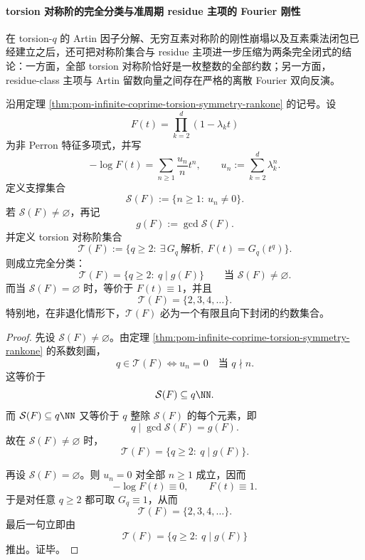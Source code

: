 \paragraph{torsion 对称阶的完全分类与准周期 residue 主项的 Fourier 刚性}
在 torsion-\(q\) 的 Artin 因子分解、无穷互素对称阶的刚性崩塌以及互素乘法闭包已经建立之后，还可把对称阶集合与 residue 主项进一步压缩为两条完全闭式的结论：一方面，全部 torsion 对称阶恰好是一枚整数的全部约数；另一方面，residue-class 主项与 Artin 留数向量之间存在严格的离散 Fourier 双向反演。

\begin{theorem}\label{thm:pom-torsion-symmetry-order-complete-classification}
沿用定理 \ref{thm:pom-infinite-coprime-torsion-symmetry-rankone} 的记号。设
\[
F(t)=\prod_{k=2}^{d}(1-\lambda_k t)
\]
为非 Perron 特征多项式，并写
\[
-\log F(t)=\sum_{n\ge 1}\frac{u_n}{n}t^n,
\qquad
u_n:=\sum_{k=2}^{d}\lambda_k^n.
\]
定义支撑集合
\[
\mathcal S(F):=\{n\ge 1:\ u_n\neq 0\}.
\]
若 \(\mathcal S(F)\neq\varnothing\)，再记
\[
g(F):=\gcd \mathcal S(F).
\]
并定义 torsion 对称阶集合
\[
\mathcal T(F):=\{q\ge 2:\ \exists\, G_q\ \text{解析},\ F(t)=G_q(t^q)\}.
\]
则成立完全分类：
\[
\boxed{\;
\mathcal T(F)
=
\{q\ge 2:\ q\mid g(F)\}
\qquad\text{当 }\mathcal S(F)\neq\varnothing.\;}
\]
而当 \(\mathcal S(F)=\varnothing\) 时，等价于 \(F(t)\equiv 1\)，并且
\[
\boxed{\;
\mathcal T(F)=\{2,3,4,\dots\}.\;}
\]
特别地，在非退化情形下，\(\mathcal T(F)\) 必为一个有限且向下封闭的约数集合。
\end{theorem}
\begin{proof}
先设 \(\mathcal S(F)\neq\varnothing\)。由定理 \ref{thm:pom-infinite-coprime-torsion-symmetry-rankone} 的系数刻画，
\[
q\in\mathcal T(F)
\iff
u_n=0\quad\text{当 }q\nmid n.
\]
这等价于
\[
\mathcal S(F)\subseteq q\NN.
\]
而 \(\mathcal S(F)\subseteq q\NN\) 又等价于 \(q\) 整除 \(\mathcal S(F)\) 的每个元素，即
\[
q\mid \gcd \mathcal S(F)=g(F).
\]
故在 \(\mathcal S(F)\neq\varnothing\) 时，
\[
\mathcal T(F)=\{q\ge 2:\ q\mid g(F)\}.
\]

再设 \(\mathcal S(F)=\varnothing\)。则 \(u_n=0\) 对全部 \(n\ge 1\) 成立，因而
\[
-\log F(t)\equiv 0,
\qquad
F(t)\equiv 1.
\]
于是对任意 \(q\ge 2\) 都可取 \(G_q\equiv 1\)，从而
\[
\mathcal T(F)=\{2,3,4,\dots\}.
\]
最后一句立即由
\[
\mathcal T(F)=\{q\ge2:\ q\mid g(F)\}
\]
推出。证毕。
\end{proof}

